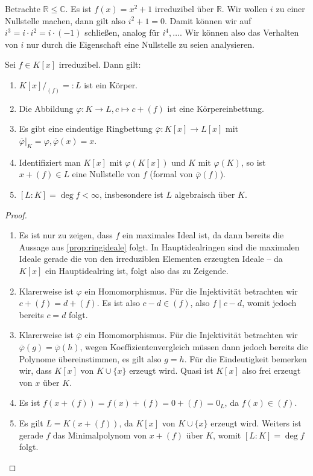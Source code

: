 \begin{example}
    Betrachte $\mathbb{R} \leq \mathbb{C}$. Es ist $f(x) = x^2 + 1$ irreduzibel über $\mathbb{R}$. Wir wollen $i$ zu einer Nullstelle machen, dann gilt also $i^2 + 1 = 0$. Damit können wir auf $i^3 = i \cdot i^2 = i \cdot (-1)$ schließen, analog für $i^4, \hdots$. Wir können also das Verhalten von $i$ nur durch die Eigenschaft eine Nullstelle zu seien analysieren.
\end{example}

\begin{proposition}[Kronecker]
    Sei $f \in K[x]$ irreduzibel. Dann gilt:
    \begin{enumerate}
        \item $K[x] /_{(f)} =: L$ ist ein Körper.
        \item Die Abbildung $\varphi : K \to L, c \mapsto c + (f)$ ist eine Körpereinbettung.
        \item Es gibt eine eindeutige Ringbettung $\overline{\varphi} : K[x] \to L[x]$ mit $\overline{\varphi} \vert_K = \varphi, \overline{\varphi}(x) = x$.
        \item Identifiziert man $K[x]$ mit $\varphi(K[x])$ und $K$ mit $\varphi(K)$, so ist
        $x + (f) \in L$  eine Nullstelle von $f$ (formal von $\overline{\varphi}(f)$).
        \item $[L : K] = \deg f < \infty$, insbesondere ist $L$ algebraisch über $K$.
    \end{enumerate}
\end{proposition}
 
\begin{proof}{\ }
    \begin{enumerate}
        \item Es ist nur zu zeigen, dass $f$ ein maximales Ideal ist, da dann bereits die Aussage aus \cref*{prop:ringideale} folgt. In Hauptidealringen sind die maximalen Ideale gerade die von den irreduziblen Elementen erzeugten Ideale -- da $K[x]$ ein Hauptidealring ist, folgt also das zu Zeigende.
        \item Klarerweise ist $\varphi$ ein Homomorphismus. Für die Injektivität betrachten wir $c + (f) = d + (f)$. Es ist also $c - d \in (f)$, also $f \mid c - d$, womit jedoch bereits $c = d$ folgt.
        \item Klarerweise ist $\overline{\varphi}$ ein Homomorphismus. Für die Injektivität betrachten wir $\overline{\varphi}(g) = \overline{\varphi}(h)$, wegen Koeffizientenvergleich müssen dann jedoch bereits die Polynome übereinstimmen, es gilt also $g = h$. Für die Eindeutigkeit bemerken wir, dass $K[x]$ von $K \cup \{ x \}$ erzeugt wird. Quasi ist $K[x]$ also frei erzeugt von $x$ über $K$.
        \item Es ist $f(x + (f)) = f(x) + (f) = 0 + (f) = 0_L$, da $f(x) \in (f)$.
        \item Es gilt $L = K(x + (f))$, da $K[x]$ von $K \cup \{x\}$ erzeugt wird. Weiters ist gerade $f$ das Minimalpolynom von $x + (f)$ über $K$, womit $[L : K] = \deg f$ folgt.
    \end{enumerate}
\end{proof}

